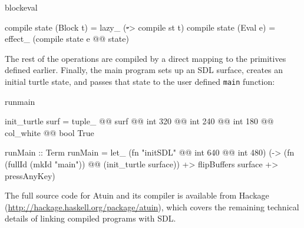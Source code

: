 \begin{SaveVerbatim}{blockeval}

compile state (Block t) = lazy_ (\st -> compile st t)
compile state (Eval e)  = effect_ (compile state e @@ state)

\end{SaveVerbatim}

\noindent
The rest of the operations are compiled by a direct mapping to the
primitives defined earlier. Finally, the main program sets up an SDL
surface, creates an initial turtle state, and passes that state to the
user defined \texttt{main} function:

\begin{SaveVerbatim}{runmain}

init_turtle surf = tuple_ @@ surf @@ int 320 @@ int 240 @@ 
                                     int 180 @@ col_white @@ bool True

runMain :: Term
runMain = let_ (fn "initSDL" @@ int 640 @@ int 480)
          (\surface -> 
            (fn (fullId (mkId "main")) @@ (init_turtle surface)) +>
             flipBuffers surface +> pressAnyKey)

\end{SaveVerbatim}

\noindent
The full source code for Atuin and its compiler is available from
Hackage (\url{http://hackage.haskell.org/package/atuin}), which
covers the remaining technical details of linking compiled programs
with SDL.
